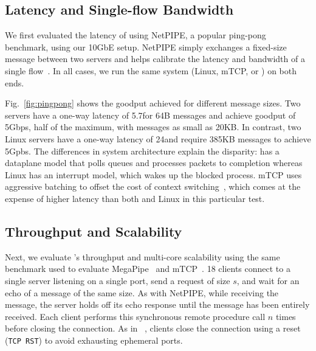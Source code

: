 \subsection{Latency and Single-flow Bandwidth}
\label{sec:eval:netpipe}

We first evaluated the latency of \ix using NetPIPE, a popular
ping-pong benchmark, using our 10GbE setup.  NetPIPE simply exchanges
a fixed-size message between two servers and helps calibrate the
latency and bandwidth of a single flow~\cite{snell1996netpipe}.  In
all cases, we run the same system (Linux, mTCP, or \ix) on both ends.

Fig.~\ref{fig:pingpong} shows the goodput achieved for different
message sizes.  Two \ix servers have a one-way latency of
5.7\microsecond for 64B messages and achieve goodput of 5Gbps, half of
the maximum, with messages as small as 20KB. In contrast, two Linux
servers have a one-way latency of 24\microsecond and require 385KB
messages to achieve 5Gpbs.  The differences in system architecture
explain the disparity: \ix has a dataplane model that polls queues and
processes packets to completion whereas Linux has an interrupt model,
which wakes up the blocked process.  mTCP uses aggressive batching to
offset the cost of context switching~\cite{jeong2014mtcp}, which comes
  at the expense of higher latency than both \ix and Linux in this
  particular test.

 


  \subsection{Throughput and Scalability}
\label{sec:eval:short}

Next, we evaluate \ix's throughput and multi-core scalability using
the same benchmark used to evaluate
MegaPipe~\cite{DBLP:conf/osdi/HanMCR12} and
mTCP~\cite{jeong2014mtcp}. {18} clients connect to a single server
listening on a single port, send a request of size $s$, and wait for
an echo of a message of the same size.  As with NetPIPE, while
receiving the message, the server holds off its echo response until
the message has been entirely received.  Each client performs this
synchronous remote procedure call $n$ times before closing the
connection.  As in ~\cite{jeong2014mtcp}, clients close the connection
using a reset (\texttt{TCP RST}) to avoid exhausting ephemeral ports.


